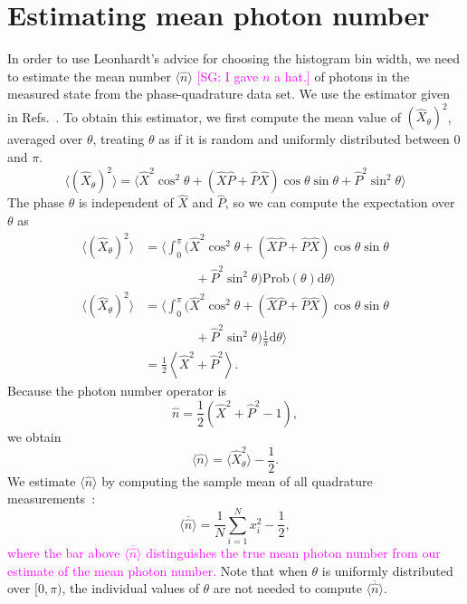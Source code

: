\documentclass[
reprint,
superscriptaddress,
showpacs,
amsmath,
amssymb,
aps,
pra,
longbibliography
]{revtex4-1}
\providecommand{\aucmnt}[1]{#1}
\providecommand{\editcolor}[2]{\textcolor{#1}{#2}}
\providecommand{\aucmnt}[1]{}
\providecommand{\editcolor}[2]{#2}
\newcommand{\SG}[1]{\editcolor{magenta}{#1}}
\newcommand{\SGc}[1]{\aucmnt{\editcolor{magenta}{[SG: #1]}}}
\begin{document}
\section{Estimating mean photon number}
\label{sec-photon-estimation}
In order to use Leonhardt's advice for choosing the histogram bin
width, we need to estimate the mean number $\langle \hat{n} \rangle$
\SGc{I gave $n$ a hat.} of photons in the measured state from the
phase-quadrature data set. We use the estimator given in
Refs.~\cite{Hradil2,Munroe1996}.  To obtain this estimator, we first
compute the mean value of $(\hat{X}_{\theta})^{2}$, averaged over
$\theta$, treating $\theta$ as if it is random and uniformly
distributed between $0$ and $\pi$.
\begin{equation}
  \langle (\hat{X}_{\theta})^{2} \rangle = \langle \hat{X}^{2}\cos^{2}\theta + (\hat{X}\hat{P}+\hat{P}\hat{X})\cos\theta\sin\theta + \hat{P}^{2}\sin^{2}\theta \rangle
\end{equation}
The phase $\theta$ is independent of $\hat{X}$ and $\hat{P}$, so we
can compute the expectation over $\theta$ as
\begin{align}
  \langle (\hat{X}_{\theta})^{2} \rangle &= \Big\langle \int_{0}^{\pi} (\hat{X}^{2}\cos^{2}\theta + (\hat{X}\hat{P}+\hat{P}\hat{X})\cos\theta\sin\theta \nonumber \\
                                         & \qquad \qquad + \hat{P}^{2}\sin^{2}\theta) \mathrm{Prob}(\theta) \mathrm{d}\theta \Big\rangle \\
  \langle (\hat{X}_{\theta})^{2} \rangle &= \Big\langle \int_{0}^{\pi} (\hat{X}^{2}\cos^{2}\theta + (\hat{X}\hat{P}+\hat{P}\hat{X})\cos\theta\sin\theta \nonumber \\
                                         & \qquad \qquad + \hat{P}^{2}\sin^{2}\theta) \frac{1}{\pi} \mathrm{d}\theta \Big\rangle \\
                                         &= \frac{1}{2}\left\langle \hat{X}^{2} + \hat{P}^{2} \right\rangle.
\end{align}
Because the photon number operator is
\begin{equation}
  \hat{n} = \frac{1}{2}\left(\hat{X}^{2}+\hat{P}^{2}-1\right),
\end{equation}
we obtain
\begin{equation}
  \langle\hat{n}\rangle = \langle \hat{X}_{\theta}^{2}\rangle-\frac{1}{2}. 
\end{equation}
We estimate $\langle \hat{n} \rangle$ by computing the sample
mean of all quadrature measurements~\cite{Hradil2,Munroe1996}:
\begin{equation}
  \overline{\langle \hat{n} \rangle} = \frac{1}{N} \sum_{i=1}^{N}x_{i}^{2} - \frac{1}{2},
  \label{eq-photon-estimation}
\end{equation}
\SG{where the bar above $\overline{\langle\hat{n}\rangle}$
  distinguishes the true mean photon number from our estimate of the
  mean photon number.}  Note that when $\theta$ is uniformly
distributed over $[0,\pi)$, the individual values of $\theta$ are not
needed to compute $\overline{\langle \hat{n} \rangle}$.
\end{document}
